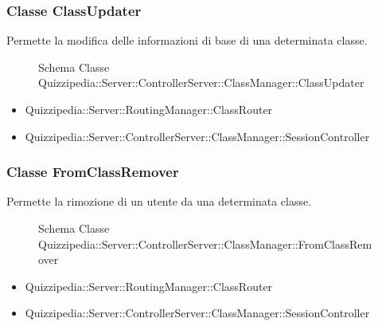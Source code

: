 \subsubsection{Classe ClassUpdater}
Permette la modifica delle informazioni di base di una determinata classe.
\begin{figure}[H]
\centering
\noindent{}
\caption{Schema Classe Quizzipedia::Server::ControllerServer::ClassManager::ClassUpdater}
\end{figure}
\begin{itemize}
\item Quizzipedia::Server::RoutingManager::ClassRouter
\end{itemize}
\begin{itemize}
\item Quizzipedia::Server::ControllerServer::ClassManager::SessionController
\end{itemize}
\subsubsection{Classe FromClassRemover}
Permette la rimozione di un utente da una determinata classe.
\begin{figure}[H]
\centering
\noindent{}
\caption{Schema Classe Quizzipedia::Server::ControllerServer::ClassManager::FromClassRemover}
\end{figure}
\begin{itemize}
\item Quizzipedia::Server::RoutingManager::ClassRouter
\end{itemize}
\begin{itemize}
\item Quizzipedia::Server::ControllerServer::ClassManager::SessionController
\end{itemize}
